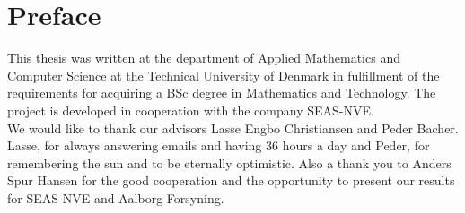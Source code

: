 \chapter{Preface}
This thesis was written at the department of Applied Mathematics and Computer Science at the Technical University of Denmark in fulfillment of the requirements for acquiring a BSc degree in Mathematics and Technology. The project is developed in cooperation with the company SEAS-NVE. \\

\noindent We would like to thank our advisors Lasse Engbo Christiansen and Peder Bacher. Lasse, for always answering emails and having 36 hours a day and Peder, for remembering the sun and to be eternally optimistic. Also a thank you to Anders Spur Hansen for the good cooperation and the opportunity to present our results for SEAS-NVE and Aalborg Forsyning. 

\vfill

{
\begin{flushright}
    \thesisauthor{}
\end{flushright}
}